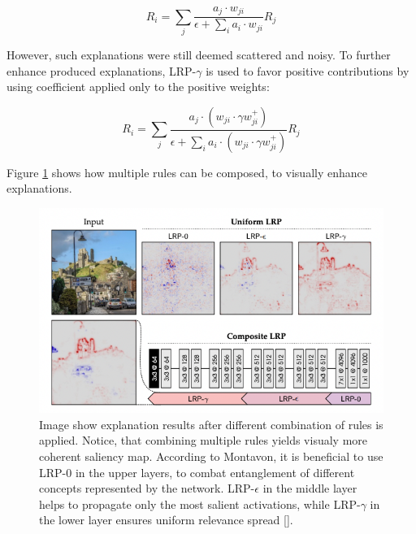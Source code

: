 \begin{equation}
    R_i = \sum_j \frac{a_j \cdot w_{ji}}{\epsilon + \sum_i a_i \cdot w_{ji}} R_j
\end{equation}

However, such explanations were still deemed scattered and noisy. To further enhance produced explanations, LRP-$\gamma$ is used to favor positive contributions by using coefficient applied only to the positive weights:

\begin{equation}
    R_i = \sum_j \frac{a_j \cdot (w_{ji} \cdot \gamma w_{ji}^+)}{\epsilon + \sum_i a_i \cdot (w_{ji} \cdot \gamma w_{ji}^+)} R_j
\end{equation}

Figure \ref{fig:lrp-montavon} shows how multiple rules can be composed, to visually enhance explanations.

\begin{figure}[!h]
    \begin{center}
    \begin{minipage}{1\textwidth}
      \includegraphics[width=\textwidth]{img/lrp-montavon.png}
    \end{minipage}
    \caption{Image show explanation results after different combination of rules is applied. Notice, that combining multiple rules yields visualy more coherent saliency map. According to Montavon, it is beneficial to use LRP-$0$ in the upper layers, to combat entanglement of different concepts represented by the network. LRP-$\epsilon$ in the middle layer helps to propagate only the most salient activations, while LRP-$\gamma$ in the lower layer ensures uniform relevance spread [].}
    \label{fig:lrp-montavon}
    \end{center}
\end{figure}